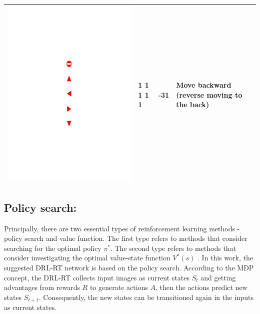 \documentclass{svproc}
\begin{document}
\begin{table}[!h]
\begin{tabular}{|C{3cm}|C{1.5cm}|C{3cm}|C{4cm}|}
		\begin{minipage}{.075\textwidth}\includegraphics[scale=.5,trim=9.1cm 8.5cm 9.5cm 18cm,clip]{signs.pdf}\end{minipage} & 1 1 1 1 1 & -31 & Move backward (reverse moving to the back) \\ \hline
	\end{tabular}
\end{table}

\subsection{Policy search:} 
Principally, there are two essential types of reinforcement learning methods - policy search and value function. The first type refers to methods that consider searching for the optimal policy $\pi^*$. The second type refers to methods that consider investigating the optimal value-state function $V^*(s)$ \cite{Arulkumaran2017Deep}. In this work, the suggested DRL-RT network is based on the policy search. According to the MDP concept, the DRL-RT collects input images as current states $S_t$ and getting advantages from rewards $R$ to generate actions $A$, then the actions predict new states $S_{t+1}$. Consequently, the new states can be transitioned again in the inputs as current states. 
\end{document}

